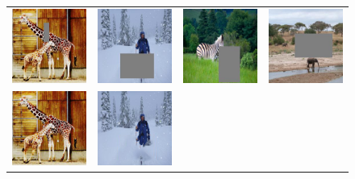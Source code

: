 \begin{figure}[H]
\centering
\small
\begin{tabular}{cccc}
\includegraphics[width=.24\textwidth]{figures/random/000000153299_ip.jpg}&
\includegraphics[width=.24\textwidth]{figures/random/000000266409_ip.jpg}&
\includegraphics[width=.24\textwidth]{figures/random/000000270244_ip.jpg}&
\includegraphics[width=.24\textwidth]{figures/random/000000286994_ip.jpg} \\
\includegraphics[width=.24\textwidth]{figures/random/000000153299_pm.jpg}&
\includegraphics[width=.24\textwidth]{figures/random/000000266409_pm.jpg}&

\end{tabular}
\end{figure}
